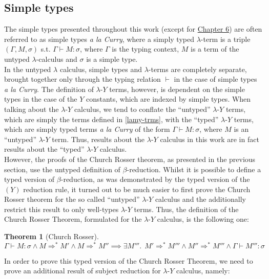 \documentclass[a4paper, 12pt, twoside]{style/ociamthesis}
\theoremstyle{plain}
\newtheorem{Theorem}{Theorem}[chapter]
\theoremstyle{definition}
\theoremstyle{remark}
\newcommand{\lamy}{\lambda\text{-}Y}
\begin{document}
\subsection{Simple types}\label{simple-types}

The simple types presented throughout this work (except for
\protect\hyperlink{itypes}{Chapter 6}) are often referred to as simple
types \emph{a la Curry}, where a simply typed \(\lambda\)-term is a
triple \((\Gamma, M, \sigma)\) s.t. \(\Gamma \vdash M : \sigma\), where
\(\Gamma\) is the typing context, \(M\) is a term of the untyped
\(\lambda\)-calculus and \(\sigma\) is a simple type.\\
In the untyped \(\lambda\) calculus, simple types and \(\lambda\)-terms
are completely separate, brought together only through the typing
relation \(\vdash\) in the case of simple types \emph{a la Curry}. The
definition of \(\lamy\) terms, however, is dependent on the simple types
in the case of the \(Y\) constants, which are indexed by simple types.
When talking about the \(\lamy\) calculus, we tend to conflate the
``untyped'' \(\lamy\) terms, which are simply the terms defined in
\ref{lamy-trms}, with the ``typed'' \(\lamy\) terms, which are simply
typed terms \emph{a la Curry} of the form \(\Gamma \vdash M : \sigma\),
where \(M\) is an ``untyped'' \(\lamy\) term. Thus, results about the
\(\lamy\) calculus in this work are in fact results about the ``typed''
\(\lamy\) calculus.\\
However, the proofs of the Church Rosser theorem, as presented in the
previous section, use the untyped definition of \(\beta\)-reduction.
Whilst it is possible to define a typed version of \(\beta\)-reduction,
as was demonstrated by the typed version of the \((Y)\) reduction rule,
it turned out to be much easier to first prove the Church Rosser theorem
for the so called ``untyped'' \(\lamy\) calculus and the additionally
restrict this result to only well-types \(\lamy\) terms. Thus, the
definition of the Church Rosser Theorem, formulated for the \(\lamy\)
calculus, is the following one:

\begin{Theorem}[Church Rosser]

\[\Gamma \vdash M : \sigma \land M \Rightarrow^* M' \land M \Rightarrow^* M'' \implies \exists M'''.\ \ M' \Rightarrow^* M''' \land M'' \Rightarrow^* M''' \land \Gamma \vdash M''' : \sigma\]

\end{Theorem}

In order to prove this typed version of the Church Rosser Theorem, we
need to prove an additional result of subject reduction for \(\lamy\)
calculus, namely:
\end{document}

